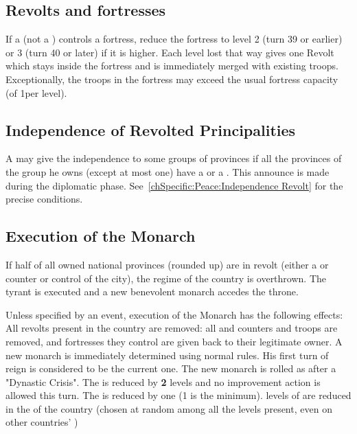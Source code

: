 \subsection{Revolts and fortresses}
\aparag If a \REVOLT (not a \REBELLION) controls a fortress, reduce the
fortress to level 2 (turn 39 or earlier) or 3 (turn 40 or later) if it is
higher.
\bparag Each level lost that way gives one Revolt \LD which stays inside the
fortress and is immediately merged with existing troops. Exceptionally, the
troops in the fortress may exceed the usual fortress capacity (of 1\LD per
level).

\subsection{Independence of Revolted Principalities}\label{chRedep:Peace:Independence Revolt}
\aparag A \MAJ may give the independence to some groups of provinces if all
the provinces of the group he owns (except at most one) have a \REVOLT or a
\REBELLION. This announce is made during the diplomatic
phase. See~\ref{chSpecific:Peace:Independence Revolt} for the precise
conditions.


\subsection{Execution of the Monarch}\label{chRedep:Execution Monarch by
  Revolts}
\aparag If half of all owned national provinces (rounded up) are in revolt
(either a \REVOLT or \REBELLION counter or control of the city), the regime of
the country is overthrown. The tyrant is executed and a new benevolent monarch
accedes the throne.

\aparag[Consequences] Unless specified by an event, execution of the
Monarch has the following effects:
\bparag All revolts present in the country are removed: all \REVOLT and
\REBELLION counters and troops are removed, and fortresses they control are
given back to their legitimate owner.
\bparag A new monarch is immediately determined using normal rules. His first
turn of reign is considered to be the current one. The new
monarch is rolled as after a "Dynastic Crisis".
\bparag The \STAB is reduced by \textbf{2} levels %
and no \STAB improvement action is allowed this turn.
\bparag The \DTI is reduced by one (1 is the minimum).
 levels of \TradeFLEET are reduced in the \CTZ of the country (chosen
at random among all the levels present, even on other countries' \TradeFLEET)

